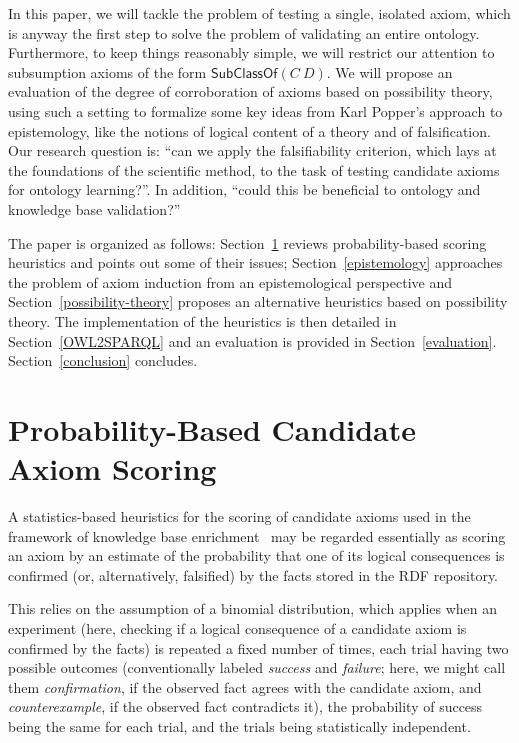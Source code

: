 \documentclass{llncs}
\begin{document}
In this paper, we will tackle the problem of testing a single, isolated axiom,
which is anyway the first step to solve the problem of validating an entire ontology.
Furthermore, to keep things reasonably simple, we will restrict our attention
to subsumption axioms of the form $\mathsf{SubClassOf}(C\ D)$.
We will propose an evaluation of the degree of corroboration of axioms
based on possibility theory, using such a setting to formalize some key ideas
from Karl Popper's approach to epistemology, like the notions of logical content
of a theory and of falsification. Our research question is: ``can we apply the
falsifiability criterion, which lays at the foundations of the scientific method,
to the task of testing candidate axioms for ontology learning?''.
In addition, ``could this be beneficial to ontology and knowledge base validation?''

The paper is organized as follows:
Section~\ref{probability} reviews probability-based scoring heuristics and
points out some of their issues; Section~\ref{epistemology} approaches the
problem of axiom induction from an epistemological perspective and
Section~\ref{possibility-theory} proposes an alternative heuristics based
on possibility theory. The implementation of the heuristics is then detailed in
Section~\ref{OWL2SPARQL} and an evaluation is provided in Section~\ref{evaluation}.
Section~\ref{conclusion} concludes.

\section{Probability-Based Candidate Axiom Scoring}
\label{probability}

A statistics-based heuristics for the scoring of candidate axioms used
in the framework of knowledge base enrichment~\cite{BuehmannLehmann2012}
may be regarded essentially as scoring an axiom by an estimate of the probability
that one of its logical consequences is confirmed (or, alternatively, falsified)
by the facts stored in the RDF repository.

This relies on the assumption of a binomial distribution, which applies when an
experiment (here, checking if a logical consequence of a candidate axiom is confirmed
by the facts) is repeated a fixed number of times, each trial having two possible outcomes
(conventionally labeled \emph{success} and \emph{failure}; here, we might call them
\emph{confirmation}, if the observed fact agrees with the candidate axiom,
and \emph{counterexample}, if the observed fact contradicts it),
the probability of success being the same for each trial,
and the trials being statistically independent.
\end{document}
